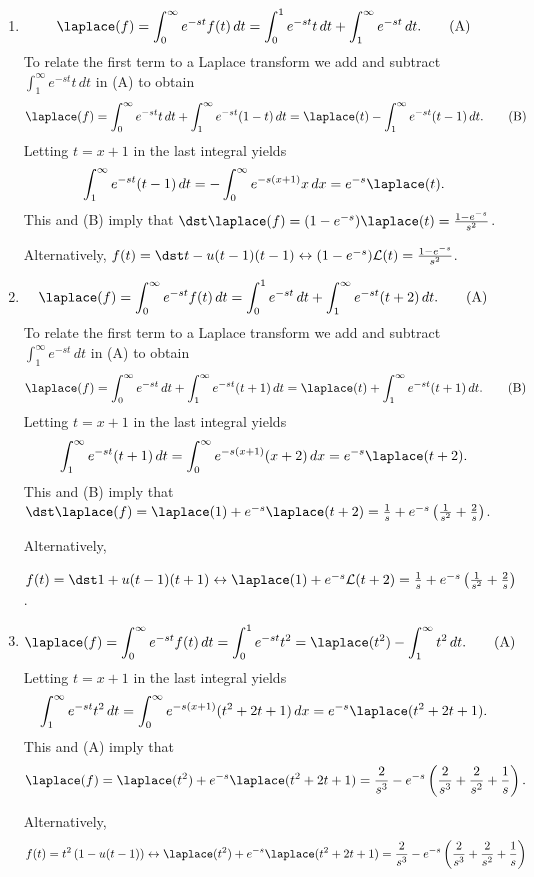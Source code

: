 \documentclass[openany]{book}
\newenvironment{sectionSolutions}{
 \begin{enumerate}[item-label={\thesection.\arabic{enumi}.}]
}{
 \end{enumerate}
}
\begin{document}
\begin{sectionSolutions}
\item
\[
\laplace (f)  =\int_0^\infty e^{-st}f(t)\, dt
 =\int_0^1 e^{-st}t\,dt+\int_1^\infty e^{-st}\,dt.
\tag{A}
\]
To relate the first term to a Laplace transform  we   add and subtract
$\int_1^\infty e^{-st}t\, dt$
  in   (A) to obtain
\[
\laplace (f)=\int_0^\infty e^{-st}t\,dt+
\int_1^\infty e^{-st}(1-t)\, dt
=\laplace (t)-\int_1^\infty e^{-st}(t-1)\,dt.
\tag{B}
\]
Letting $t=x+1$  in the last integral yields
\[
\int_1^\infty e^{-st}(t-1)\,dt=-\int_0^\infty e^{-s(x+1)}x\,dx
 =e^{-s}\laplace (t).
\]
This and (B) imply that
$\dst\laplace (f)=(1-e^{-s})\laplace (t)
= \frac{1-e^{-s}}{ s^2}$.

Alternatively,
$f(t)=\dst t-u(t-1)(t-1)\leftrightarrow(1-e^{-s}){\cal
L}(t)= \frac{1-e^{-s}}{ s^2}$.



\item
\[
\laplace (f)  =\int_0^\infty e^{-st}f(t)\, dt
 =\int_0^1 e^{-st}\,dt+\int_1^\infty e^{-st}(t+2)\,dt.
\tag{A}
\]
To relate the first term to a Laplace transform  we   add and subtract
$\int_1^\infty e^{-st}\, dt$
  in   (A) to obtain
\[
\laplace (f)=\int_0^\infty e^{-st}\,dt+
\int_1^\infty e^{-st}(t+1)\, dt
=\laplace (t)+\int_1^\infty e^{-st}(t+1)\,dt.
\tag{B}
\]
Letting $t=x+1$  in the last integral yields
\[
\int_1^\infty e^{-st}(t+1)\,dt=\int_0^\infty e^{-s(x+1)}(x+2)\,dx
 =e^{-s}\laplace (t+2).
\]
This and (B) imply that
$\dst\laplace (f)=\laplace (1)+e^{-s}\laplace (t+2)
= \frac{1}{ s}+e^{-s}\left(\frac{1}{ s^2}+\frac{2}{ s}\right)$.

Alternatively,

 $f(t)=\dst1+u(t-1)(t+1)\leftrightarrow \laplace (1)+e^{-s}{\cal
L}(t+2)=
\frac{1}{ s}+e^{-s}\left(\frac{1}{ s^2}+\frac{2}{ s}\right)$.


\item
\[
\laplace (f)  =\int_0^\infty e^{-st}f(t)\, dt
 =\int_0^1 e^{-st}t^2=\laplace (t^2)-\int_1^\infty t^2\,dt.
\tag{A}
\]
Letting $t=x+1$  in the last integral yields
\[
\int_1^\infty e^{-st}t^2\,dt=\int_0^\infty e^{-s(x+1)}(t^2+2t+1)\,dx
 =e^{-s}\laplace (t^2+2t+1).
\]
This and (A) imply that
\[
\laplace (f)=\laplace (t^2)+e^{-s}\laplace  (t^2+2t+1)
=\frac{2}{ s^3}-e^{-s}\left(\frac{2}{ s^3}+\frac{2}{ s^2}+\frac{1}{
s}\right).
\]

Alternatively,
\[
f(t)=t^2\left(1-u(t-1)\right)\leftrightarrow
\laplace (t^2)+e^{-s}\laplace  (t^2+2t+1)=
\frac{2}{ s^3}-e^{-s}\left(\frac{2}{ s^3}+\frac{2}{ s^2}+\frac{1}{ s}\right)
\]



\end{sectionSolutions}
\end{document}
